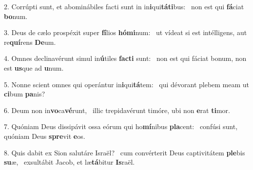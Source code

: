 2. Corrúpti sunt, et abominábiles facti sunt in in\textbf{i}qui\textbf{tá}\textbf{ti}bus: \ast\  non est qui \textbf{fá}ciat \textbf{bo}num.\

3. Deus de cælo prospéxit super \textbf{fí}lios \textbf{hó}\textbf{mi}num: \ast\  ut vídeat si est intélligens, aut re\textbf{quí}rens \textbf{De}um.\

4. Omnes declinavérunt simul in\textbf{ú}tiles \textbf{fac}\textbf{ti} sunt: \ast\  non est qui fáciat bonum, non est \textbf{us}que ad \textbf{u}num.\

5. Nonne scient omnes qui operántur in\textbf{i}qui\textbf{tá}tem: \ast\  qui dévorant plebem meam ut \textbf{ci}bum \textbf{pa}nis?\

6. Deum non in\textbf{vo}ca\textbf{vé}runt, \ast\  illic trepidavérunt timóre, ubi non \textbf{e}rat \textbf{ti}mor.\

7. Quóniam Deus dissipávit ossa eórum qui ho\textbf{mí}nibus \textbf{pla}cent: \ast\  confúsi sunt, quóniam Deus \textbf{spre}vit \textbf{e}os.\

8. Quis dabit ex Sion salutáre Israël? \dag\  cum convérterit Deus captivitátem \textbf{ple}bis \textbf{su}æ, \ast\  exsultábit Jacob, et læ\textbf{tá}bitur \textbf{Is}raël.\

